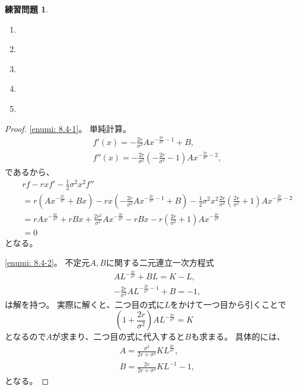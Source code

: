 \documentclass[uplatex]{jsarticle}
\theoremstyle{definition}
\newtheorem{prob}[prob]{練習問題}
\begin{document}
\begin{prob}\label{prob: 8.4}
  \begin{enumerate}
    \item \label{enumi: 8.4-1}
    \item \label{enumi: 8.4-2}
    \item \label{enumi: 8.4-3}
    \item \label{enumi: 8.4-4}
    \item \label{enumi: 8.4-5}
  \end{enumerate}
\end{prob}

\begin{proof}
  \ref{enumi: 8.4-1}。
  単純計算。
  \begin{align*}
    &f'(x) = - \frac{2r}{\sigma^2}Ax^{- \frac{2r}{\sigma^2} - 1} + B, \\
    &f''(x) = - \frac{2r}{\sigma^2}\left( - \frac{2r}{\sigma^2} - 1\right)
    Ax^{- \frac{2r}{\sigma^2} - 2},
  \end{align*}
  であるから、
  \begin{align*}
    &rf - rxf' - \frac{1}{2}\sigma^2x^2f'' \\
    &= r \left( Ax^{-\frac{2r}{\sigma^2}}+Bx \right)
    - rx \left( - \frac{2r}{\sigma^2}Ax^{- \frac{2r}{\sigma^2} - 1} + B \right)
    - \frac{1}{2}\sigma^2x^2
    \frac{2r}{\sigma^2}\left( \frac{2r}{\sigma^2} + 1 \right)
    Ax^{- \frac{2r}{\sigma^2} - 2} \\
    &= rAx^{-\frac{2r}{\sigma^2}} + rBx
    + \frac{2r^2}{\sigma^2}Ax^{-\frac{2r}{\sigma^2}} - rBx
    - r\left( \frac{2r}{\sigma^2} + 1 \right)
    Ax^{-\frac{2r}{\sigma^2}} \\
    &= 0
  \end{align*}
  となる。

  \ref{enumi: 8.4-2}。
  不定元\(A,B\)に関する二元連立一次方程式
  \begin{align*}
    &AL^{-\frac{2r}{\sigma^2}} + BL = K-L, \\
    &-\frac{2r}{\sigma^2}AL^{-\frac{2r}{\sigma^2}-1} + B = -1,
  \end{align*}
  は解を持つ。
  実際に解くと、二つ目の式に\(L\)をかけて一つ目から引くことで
  \[
  \left(1+\frac{2r}{\sigma^2}\right) A L^{-\frac{2r}{\sigma^2}} = K
  \]
  となるので\(A\)が求まり、二つ目の式に代入すると\(B\)も求まる。
  具体的には、
  \begin{align*}
    &A = \frac{\sigma^2}{2r+\sigma^2}KL^{\frac{2r}{\sigma^2}}, \\
    &B = \frac{2r}{2r+\sigma^2}KL^{-1} - 1,
  \end{align*}
  となる。


\end{proof}
\end{document}
